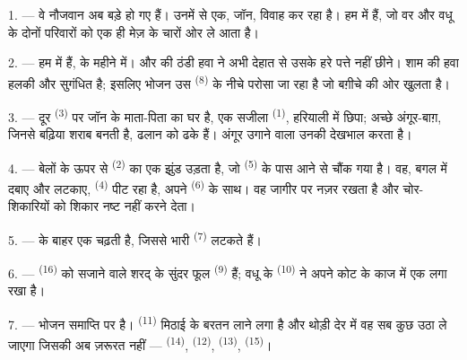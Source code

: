 
\VUsaut{4.0mm}
\VUsaut{1.6mm}
\VUsaut{3.2mm}

\VUsaut{1.6mm}
\VUsaut{2.6mm}

\VUsaut{3.0mm}

1. --- वे नौजवान अब बड़े हो गए हैं। उनमें से एक, जॉन, विवाह कर रहा है। हम
 में हैं, जो वर और वधू के दोनों परिवारों को एक ही मेज़ के
चारों ओर ले आता है।

2. --- हम  में हैं,  के महीने में।
 और  की ठंडी हवा ने अभी देहात से उसके हरे पत्ते
नहीं छीने। शाम की हवा हलकी और सुगंधित है; इसलिए भोजन उस 
\textsuperscript{(8)} के नीचे परोसा जा रहा है जो बग़ीचे की ओर खुलता है।

3. --- दूर  \textsuperscript{(3)} पर जॉन के माता-पिता का घर है, एक
सजीला  \textsuperscript{(1)}, हरियाली में छिपा; अच्छे
अंगूर-बाग़, जिनसे बढ़िया शराब बनती है, ढलान को ढके हैं। अंगूर उगाने वाला उनकी
देखभाल करता है।

4. --- बेलों के ऊपर से  \textsuperscript{(2)} का एक झुंड उड़ता है,
जो  \textsuperscript{(5)} के पास आने से चौंक गया है। वह,
बगल में  दबाए और  लटकाए,
 \textsuperscript{(4)} पीट रहा है, अपने 
\textsuperscript{(6)} के साथ। वह जागीर पर नज़र रखता है और चोर-शिकारियों को शिकार नष्ट नहीं करने
देता।

5. ---  के बाहर एक  चढ़ती है, जिससे भारी
 \textsuperscript{(7)} लटकते हैं।

6. ---  \textsuperscript{(16)} को सजाने वाले शरद् के सुंदर फूल
 \textsuperscript{(9)} हैं; वधू के 
\textsuperscript{(10)} ने अपने कोट के काज में एक लगा रखा है।

7. --- भोजन समाप्ति पर है।  \textsuperscript{(11)} मिठाई के बरतन
लाने लगा है और थोड़ी देर में वह सब कुछ उठा ले जाएगा जिसकी अब ज़रूरत नहीं —
 \textsuperscript{(14)},  \textsuperscript{(12)},
 \textsuperscript{(13)}, 
\textsuperscript{(15)}।

